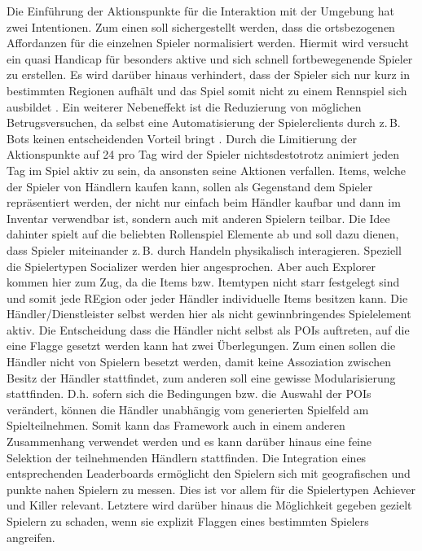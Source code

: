 Die Einführung der Aktionspunkte für die Interaktion mit der Umgebung hat zwei Intentionen. Zum einen soll sichergestellt werden, dass die ortsbezogenen Affordanzen für die einzelnen Spieler normalisiert werden. Hiermit wird versucht ein quasi Handicap für besonders aktive und sich schnell fortbewegenende Spieler zu erstellen. Es wird darüber hinaus verhindert, dass der Spieler sich nur kurz in bestimmten Regionen aufhält und das Spiel somit nicht zu einem Rennspiel sich ausbildet \cite{Schlieder.2005}. Ein weiterer Nebeneffekt ist die Reduzierung von möglichen Betrugsversuchen, da selbst eine Automatisierung der Spielerclients durch z.\,B. Bots keinen entscheidenden Vorteil bringt \cite{Golle.2005}. Durch die Limitierung der Aktionspunkte auf 24 pro Tag wird der Spieler nichtsdestotrotz animiert jeden Tag im Spiel aktiv zu sein, da ansonsten seine Aktionen \glqq verfallen\grqq. Items, welche der Spieler von Händlern kaufen kann, sollen als Gegenstand dem Spieler repräsentiert werden, der nicht nur einfach beim Händler kaufbar und dann im Inventar verwendbar ist, sondern auch mit anderen Spielern teilbar. Die Idee dahinter spielt auf die beliebten Rollenspiel Elemente ab und soll dazu dienen, dass Spieler miteinander z.\,B. durch Handeln physikalisch interagieren. Speziell die Spielertypen Socializer werden hier angesprochen. Aber auch Explorer kommen hier zum Zug, da die Items bzw. Itemtypen nicht starr festgelegt sind und somit jede REgion oder jeder Händler individuelle Items besitzen kann. Die Händler/Dienstleister selbst werden hier als nicht gewinnbringendes Spielelement aktiv. Die Entscheidung dass die Händler nicht selbst als POIs auftreten, auf die eine Flagge gesetzt werden kann hat zwei Überlegungen. Zum einen sollen die Händler nicht von Spielern \glqq besetzt\grqq{} werden, damit keine Assoziation zwischen \glqq Besitz\grqq{} der Händler stattfindet, zum anderen soll eine gewisse Modularisierung stattfinden. D.h. sofern sich die Bedingungen bzw. die Auswahl der POIs verändert, können die Händler unabhängig vom generierten Spielfeld am Spielteilnehmen. Somit kann das Framework auch in einem anderen Zusammenhang verwendet werden und es kann darüber hinaus eine feine Selektion der teilnehmenden Händlern stattfinden.
Die Integration eines entsprechenden Leaderboards ermöglicht den Spielern sich mit geografischen und punkte nahen Spielern zu messen. Dies ist vor allem für die Spielertypen Achiever und Killer relevant. Letztere wird darüber hinaus die Möglichkeit gegeben gezielt Spielern zu schaden, wenn sie explizit Flaggen eines bestimmten Spielers angreifen.
